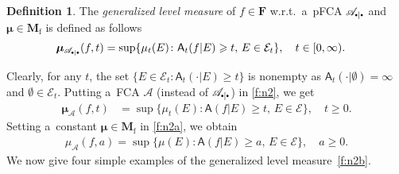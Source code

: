 \documentclass[preprint,11pt]{elsarticle}
\theoremstyle{definition}
\newtheorem{definition}[tw]{Definition}
\newcommand\bF{\mathbf{F}} %
\newcommand\bMf{\mathbf{M}_{\mathrm{f}}}%
\newcommand\cE{{\mathcal E}}
\newcommand\sA{\mathsf{A}}
\newcommand\aA[2][E]{\sA(#2|#1)}%
\newcommand\aAd[3][E]{\sA_{#3}(#2|#1)}%
\newcommand\sbullet[1][.5]{\mathbin{\vcenter{\hbox{\scalebox{#1}{$\bullet$}}}}}
\newcommand\bA{\mathscr{A}}%
\newcommand\bpeA{\mathscr {A}_{\sbullet|\sbullet}}%
\newcommand\mub[1][\bA]{\mu_{#1}}
\newcommand{\bmu}{\boldsymbol{\mu}}
\newcommand\bmub[1][\bpeA]{\bmu_{#1}}
\renewcommand\ge{\geqslant}
\begin{document}
\begin{definition}\label{def:gfs}
The \textit{generalized level measure} of  $f\in\bF$ w.r.t.~a~pFCA $\bpeA$ and $\bmu\in \bMf$ is defined as follows
\begin{align}\label{f:n2}
    \bmub(f,t)&=\sup\{\mu_t(E)\colon \aAd{f}{t}\ge t,\, E\in \cE_t\},\quad t\in [0,\infty).
\end{align}
\end{definition}

\medskip

Clearly,  for any $t$, the set $\{E\in \cE_t\colon \aAd{\cdot}{t}\ge t\}$ is nonempty  as $\aAd[\emptyset]{\cdot}{t}=\infty$ and $\emptyset\in\cE_t.$
Putting a~FCA $\bA$ (instead of $\bpeA$) in \eqref{f:n2}, we get
\begin{align}\label{f:n2a}
    \bmub[\bA](f,t)&=\sup\{\mu_t(E)\colon \aA{f}\ge t,\, E\in \cE\}, \quad t\ge 0.
\end{align}
Setting a~constant $\bmu\in\bMf$ in \eqref{f:n2a}, we obtain %
\begin{align}\label{f:n2b}
    \mub(f,a)=\sup\{\mu(E)\colon \aA{f}\ge a,\, E\in \cE\}, \quad a\ge 0.
\end{align}
We now give four simple examples of the generalized level measure~\eqref{f:n2b}.
\end{document}
